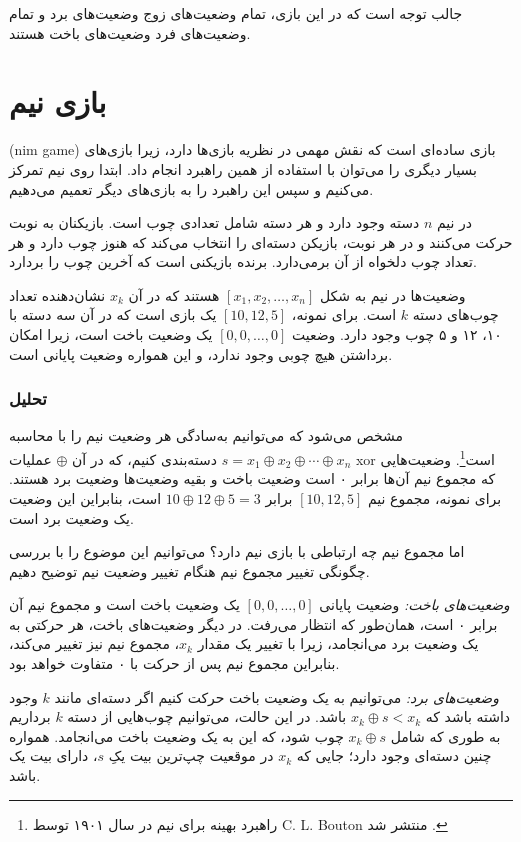 جالب توجه است که در این بازی،
تمام وضعیت‌های زوج وضعیت‌های برد
و تمام وضعیت‌های فرد وضعیت‌های باخت هستند.

\section{بازی نیم}


 (nim game) بازی ساده‌ای است که
نقش مهمی در نظریه بازی‌ها دارد،
زیرا بازی‌های بسیار دیگری را می‌توان با استفاده از
همین راهبرد انجام داد.
ابتدا روی نیم تمرکز می‌کنیم
و سپس این راهبرد را به بازی‌های دیگر
تعمیم می‌دهیم.

در نیم $n$ دسته وجود دارد
و هر دسته شامل تعدادی چوب است.
بازیکنان به نوبت حرکت می‌کنند
و در هر نوبت، بازیکن دسته‌ای را انتخاب می‌کند
که هنوز چوب دارد
و هر تعداد چوب دلخواه از آن برمی‌دارد.
برنده بازیکنی است که آخرین چوب را بردارد.

وضعیت‌ها در نیم به شکل
$[x_1,x_2,\ldots,x_n]$ هستند
که در آن $x_k$ نشان‌دهنده تعداد چوب‌های دسته $k$ است.
برای نمونه، $[10,12,5]$ یک بازی است که
در آن سه دسته با ۱۰، ۱۲ و ۵ چوب وجود دارد.
وضعیت $[0,0,\ldots,0]$ یک وضعیت باخت است،
زیرا امکان برداشتن هیچ چوبی وجود ندارد،
و این همواره وضعیت پایانی است.

\subsubsection{تحلیل}

مشخص می‌شود که می‌توانیم به‌سادگی
هر وضعیت نیم را با محاسبه
 $s = x_1 \oplus x_2 \oplus \cdots \oplus x_n$
دسته‌بندی کنیم،
که در آن $\oplus$ عملیات xor است\footnote{راهبرد بهینه
برای نیم در سال ۱۹۰۱ توسط C. L. Bouton منتشر شد \cite{bou01}.}.
وضعیت‌هایی که مجموع نیم آن‌ها برابر ۰ است وضعیت باخت
و بقیه وضعیت‌ها وضعیت برد هستند.
برای نمونه، مجموع نیم
$[10,12,5]$ برابر $10 \oplus 12 \oplus 5 = 3$ است،
بنابراین این وضعیت یک وضعیت برد است.

اما مجموع نیم چه ارتباطی با بازی نیم دارد؟
می‌توانیم این موضوع را با بررسی چگونگی تغییر
مجموع نیم هنگام تغییر وضعیت نیم توضیح دهیم.

\textit{وضعیت‌های باخت:}
وضعیت پایانی $[0,0,\ldots,0]$ یک وضعیت باخت است
و مجموع نیم آن برابر ۰ است، همان‌طور که انتظار می‌رفت.
در دیگر وضعیت‌های باخت، هر حرکتی به
یک وضعیت برد می‌انجامد، زیرا با تغییر یک مقدار $x_k$،
مجموع نیم نیز تغییر می‌کند، بنابراین مجموع نیم
پس از حرکت با ۰ متفاوت خواهد بود.

\textit{وضعیت‌های برد:}
می‌توانیم به یک وضعیت باخت حرکت کنیم اگر
دسته‌ای مانند $k$ وجود داشته باشد که $x_k \oplus s < x_k$ باشد.
در این حالت، می‌توانیم چوب‌هایی از
دسته $k$ برداریم به طوری که شامل $x_k \oplus s$ چوب شود،
که این به یک وضعیت باخت می‌انجامد.
همواره چنین دسته‌ای وجود دارد؛ جایی که $x_k$
در موقعیت چپ‌ترین بیت یکِ $s$، دارای بیت یک باشد.

